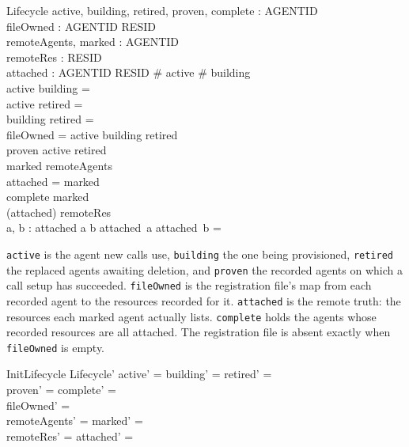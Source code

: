 \documentclass[a4paper,10pt,fleqn]{article}
\begin{document}
\begin{schema}{Lifecycle}
  active, building, retired, proven, complete : \power AGENTID \\
  fileOwned : AGENTID \pfun \power RESID \\
  remoteAgents, marked : \power AGENTID \\
  remoteRes : \power RESID \\
  attached : AGENTID \pfun \power RESID
\where
  \# active  \land \# building  \\
  active \cap building = \emptyset \\
  active \cap retired = \emptyset \\
  building \cap retired = \emptyset \\
  \dom fileOwned = active \cup building \cup retired \\
  proven \subseteq active \cup retired \\
  marked \subseteq remoteAgents \\
  \dom attached = marked \\
  complete \subseteq marked \\
  \bigcup (\ran attached) \subseteq remoteRes \\
  \forall a, b : \dom attached \spot a \neq b \implies
    attached~a \cap attached~b = \emptyset
\end{schema}

\texttt{active} is the agent new calls use, \texttt{building} the one being
provisioned, \texttt{retired} the replaced agents awaiting deletion, and
\texttt{proven} the recorded agents on which a call setup has succeeded.
\texttt{fileOwned} is the registration file's map from each recorded agent
to the resources recorded for it. \texttt{attached} is the remote truth: the
resources each marked agent actually lists. \texttt{complete} holds the
agents whose recorded resources are all attached. The registration file is
absent exactly when \texttt{fileOwned} is empty.

\begin{schema}{InitLifecycle}
  Lifecycle'
\where
  active' = \emptyset \land building' = \emptyset \land retired' = \emptyset \\
  proven' = \emptyset \land complete' = \emptyset \\
  fileOwned' = \emptyset \\
  remoteAgents' = \emptyset \land marked' = \emptyset \\
  remoteRes' = \emptyset \land attached' = \emptyset
\end{schema}
\end{document}
